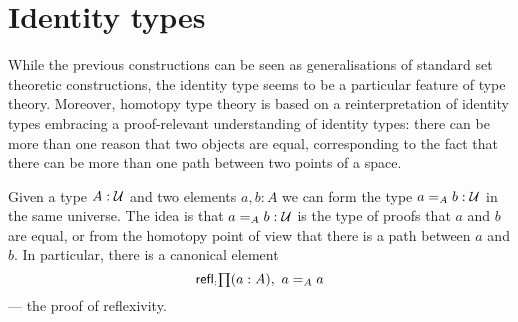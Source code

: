 \section{Identity types}
\label{sec:identity-types}

While the previous constructions can be seen as generalisations of
standard set theoretic constructions, the identity type seems to be
a particular feature of type theory. Moreover, homotopy type theory is
based on a reinterpretation of identity types embracing a
proof-relevant understanding of identity types: there can be more than
one reason that two objects are equal, corresponding to the fact that
there can be more than one path between two points of a space.

Given a type $A:\mathcal{U}$ and two elements $a,b:A$ we can form the type $a=_A b:\mathcal{U}$ in the same universe. The idea is that $a=_A b:\mathcal{U}$ is the type of proofs that $a$ and $b$ are equal, or from the homotopy point of view that there is a path between $a$ and $b$. In particular, there is a canonical element
\[\refl : \prd{a:A} a =_A a\] --- the proof of reflexivity.


